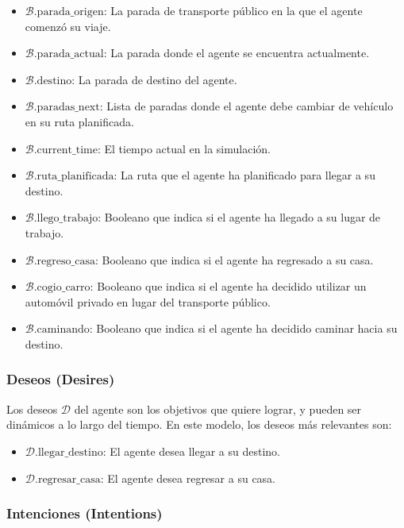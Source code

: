 \documentclass[a4paper,12pt]{article}
\begin{document}
\begin{itemize}
    \item $\mathcal{B}.\text{parada\_origen}$: La parada de transporte público en la que el agente comenzó su viaje.
    \item $\mathcal{B}.\text{parada\_actual}$: La parada donde el agente se encuentra actualmente.
    \item $\mathcal{B}.\text{destino}$: La parada de destino del agente.
    \item $\mathcal{B}.\text{paradas\_next}$: Lista de paradas donde el agente debe cambiar de vehículo en su ruta planificada.
    \item $\mathcal{B}.\text{current\_time}$: El tiempo actual en la simulación.
    \item $\mathcal{B}.\text{ruta\_planificada}$: La ruta que el agente ha planificado para llegar a su destino.
    \item $\mathcal{B}.\text{llego\_trabajo}$: Booleano que indica si el agente ha llegado a su lugar de trabajo.
    \item $\mathcal{B}.\text{regreso\_casa}$: Booleano que indica si el agente ha regresado a su casa.
    \item $\mathcal{B}.\text{cogio\_carro}$: Booleano que indica si el agente ha decidido utilizar un automóvil privado en lugar del transporte público.
    \item $\mathcal{B}.\text{caminando}$: Booleano que indica si el agente ha decidido caminar hacia su destino.
\end{itemize}

\subsubsection{Deseos (Desires)}

Los deseos $\mathcal{D}$ del agente son los objetivos que quiere lograr, y pueden ser dinámicos a lo largo del tiempo. En este modelo, los deseos más relevantes son:

\begin{itemize}
    \item $\mathcal{D}.\text{llegar\_destino}$: El agente desea llegar a su destino.
    \item $\mathcal{D}.\text{regresar\_casa}$: El agente desea regresar a su casa.
\end{itemize}

\subsubsection{Intenciones (Intentions)}
\end{document}
